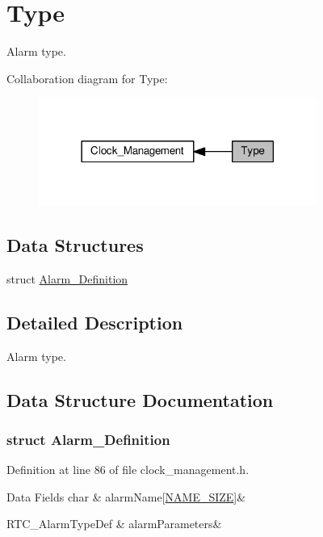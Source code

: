 \hypertarget{group__type}{}\section{Type}
\label{group__type}


Alarm type.  


Collaboration diagram for Type\+:\nopagebreak
\begin{figure}[H]
\begin{center}
\leavevmode
\includegraphics[width=258pt]{dd/d8f/group__type}
\end{center}
\end{figure}
\subsection*{Data Structures}
\begin{DoxyCompactItemize}
\item 
struct \hyperlink{group__type_d4/d90/struct_alarm___definition}{Alarm\+\_\+\+Definition}
\end{DoxyCompactItemize}


\subsection{Detailed Description}
Alarm type. 



\subsection{Data Structure Documentation}
\label{struct_alarm___definition}
\hypertarget{group__type_struct_alarm___definition}{}
\subsubsection{struct Alarm\+\_\+\+Definition}


Definition at line 86 of file clock\+\_\+management.\+h.

\begin{DoxyFields}{Data Fields}
char\hypertarget{group__type_a69a8bc4ad7884ca26f0c942d5ef3f430}{}\label{group__type_a69a8bc4ad7884ca26f0c942d5ef3f430}
&
alarm\+Name\mbox{[}\hyperlink{group___clock__management__constants_ga834e9a379307f869a10f4da078be5786}{N\+A\+M\+E\+\_\+\+S\+I\+ZE}\mbox{]}&
\\
\hline

R\+T\+C\+\_\+\+Alarm\+Type\+Def\hypertarget{group__type_aec96eda8f1baa300f50a7ef3d8a9f342}{}\label{group__type_aec96eda8f1baa300f50a7ef3d8a9f342}
&
alarm\+Parameters&
\\
\hline

\end{DoxyFields}
